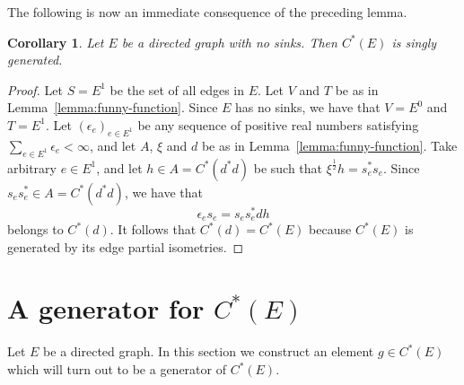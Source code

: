 \documentclass[12pt, a4paper]
{amsart}
\newtheorem{coro}[thm]{Corollary}
\theoremstyle{definition}
\theoremstyle{remark}
\numberwithin{equation}{section}
\newcommand{\Cstar}{\ensuremath{C^*}}
\begin{document}
The following is now an immediate consequence of the preceding lemma.

\begin{coro}\label{corollary:no-sinks}
    Let $E$ be a directed graph with no sinks. Then $C^*(E)$ is singly generated.
\end{coro}

\begin{proof}
    Let $S = E^1$ be the set of all edges in $E$. Let $V$ and $T$ be as in Lemma~\ref{lemma:funny-function}. Since $E$ has no sinks, we have that $V = E^0$ and $T = E^1$. Let $(\epsilon_e)_{e \in E^1}$ be any sequence of positive real numbers satisfying $\sum_{e \in E^1} \epsilon_e < \infty$, and let $A$, $\xi$ and $d$ be as in Lemma~\ref{lemma:funny-function}. Take arbitrary $e \in E^1$, and let $h \in A = \Cstar(d^*d)$ be such that $\xi^{\frac{1}{2}}h = s_e^* s_e$. Since $s_e s_e^* \in A = \Cstar(d^*d)$, we have that
    \begin{equation}
    \epsilon_e s_e = s_e s_e^* d h
    \end{equation}
    belongs to $\Cstar(d)$. It follows that $\Cstar(d) = \Cstar(E)$ because $\Cstar(E)$ is generated by its edge partial isometries.  
\end{proof}

\section{A generator for $\Cstar(E)$}
\label{sec:g}

Let $E$ be a directed graph. In this section we construct an element $g\in \Cstar(E)$ which will turn out to be a generator of $\Cstar(E)$.
\end{document}

